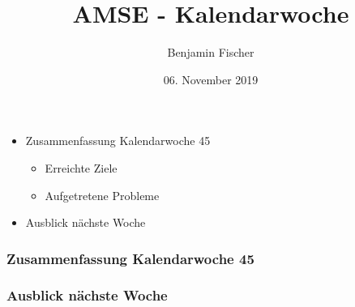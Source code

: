 \documentclass{beamer}
\title{AMSE - Kalendarwoche \cw{}}
\date{06. November 2019}
\author{Benjamin Fischer}
\institute{benjamin.f.fischer@fau.de}
\newcommand{\cw}{45}
\begin{document}
  \maketitle

  \begin{frame}
    \begin{itemize}
      \item Zusammenfassung Kalendarwoche \cw{}
      \begin{itemize}
        \item Erreichte Ziele
        \item Aufgetretene Probleme
      \end{itemize}
      \item Ausblick nächste Woche
    \end{itemize}
  \end{frame}

  \begin{frame}
    \frametitle{Zusammenfassung Kalendarwoche \cw{}}

  \end{frame}

  \begin{frame}
    \frametitle{Ausblick nächste Woche}
    
  \end{frame}
\end{document}
